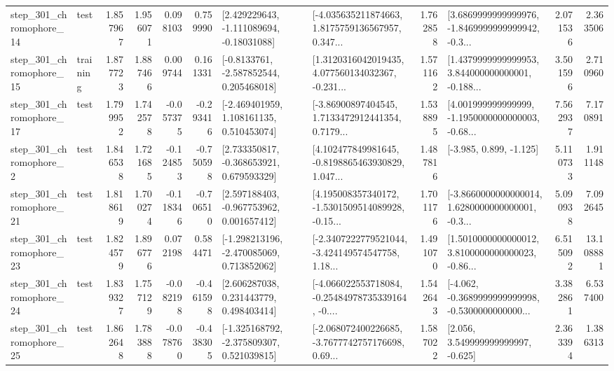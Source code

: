 \begin{tabular}{llrrrrllrlrr}
  step\_301\_chromophore\_14 &      test &      1.857967 &    1.956071 &      0.098103 &  0.759990 &    [2.429229643, -1.111089694, -0.18031088] &  [-4.035635211874663, 1.8175759136567957, 0.347... &       1.762858 &  [3.6869999999999976, -1.8469999999999942, -0.3... &            2.071536 &          2.363506 \\
  step\_301\_chromophore\_15 &  training &      1.877723 &    1.887466 &      0.009744 &  0.161331 &     [-0.8133761, -2.587852544, 0.205468018] &  [1.3120316042019435, 4.077560134032367, -0.231... &       1.571162 &  [1.4379999999999953, 3.844000000000001, -0.188... &            3.501596 &          2.710960 \\
  step\_301\_chromophore\_17 &      test &      1.799952 &    1.742578 &     -0.057375 & -0.293416 &    [-2.469401959, 1.108161135, 0.510453074] &  [-3.86900897404545, 1.7133472912441354, 0.7179... &       1.538895 &  [4.001999999999999, -1.1950000000000003, -0.68... &            7.562937 &          7.170891 \\
   step\_301\_chromophore\_2 &      test &      1.846538 &    1.721685 &     -0.124853 & -0.750598 &    [2.733350817, -0.368653921, 0.679593329] &  [4.102477849981645, -0.8198865463930829, 1.047... &       1.487816 &                            [-3.985, 0.899, -1.125] &            5.110733 &          1.911148 \\
  step\_301\_chromophore\_21 &      test &      1.818619 &    1.700274 &     -0.118346 & -0.706510 &    [2.597188403, -0.967753962, 0.001657412] &  [4.195008357340172, -1.5301509514089928, -0.15... &       1.701176 &  [-3.8660000000000014, 1.6280000000000001, -0.3... &            5.090938 &          7.092645 \\
  step\_301\_chromophore\_23 &      test &      1.824579 &    1.896776 &      0.072198 &  0.584471 &   [-1.298213196, -2.470085069, 0.713852062] &  [-2.3407222779521044, -3.424149574547758, 1.18... &       1.491070 &  [1.5010000000000012, 3.8100000000000023, -0.86... &            6.515092 &         13.108881 \\
  step\_301\_chromophore\_24 &      test &      1.839327 &    1.757129 &     -0.082198 & -0.461598 &     [2.606287038, 0.231443779, 0.498403414] &  [-4.066022553718084, -0.25484978735339164, -0.... &       1.542643 &  [-4.062, -0.3689999999999998, -0.5300000000000... &            3.382861 &          6.537400 \\
  step\_301\_chromophore\_25 &      test &      1.862648 &    1.783888 &     -0.078760 & -0.438305 &   [-1.325168792, -2.375809307, 0.521039815] &  [-2.068072400226685, -3.7677742757176698, 0.69... &       1.587022 &                 [2.056, 3.549999999999997, -0.625] &            2.363394 &          1.386313 \\

\end{tabular}
